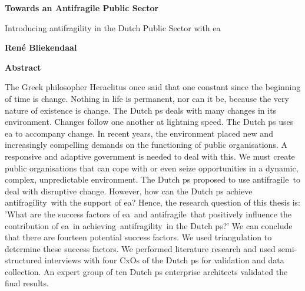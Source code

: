 \thispagestyle{plain}
\begin{center}
	\Large
	\textbf{Towards an Antifragile Public Sector}
	
	\vspace{0.4cm}
	\large
	Introducing \Gls{antifragility} in the Dutch Public Sector with \gls{ea}
	
	\vspace{0.4cm}
	\textbf{René Bliekendaal}
	
	\vspace{0.9cm}
	\textbf{Abstract}
\end{center}

\small \noindent The Greek philosopher Heraclitus once said that one constant since the beginning of time is change. Nothing in life is permanent, nor can it be, because the very nature of existence is change. The Dutch \gls{ps} deals with many changes in its environment. Changes follow one another at lightning speed. The Dutch \gls{ps} uses \gls{ea} to accompany change. In recent years, the environment placed new and increasingly compelling demands on the functioning of public organisations. A responsive and adaptive government is needed to deal with this. We must create public organisations that can cope with or even seize opportunities in a dynamic, complex, unpredictable environment. The Dutch \gls{ps} proposed to use \gls{antifragile} to deal with disruptive change. However, how can the Dutch \gls{ps} achieve \gls{antifragility} with the support of \gls{ea}? Hence, the research question of this thesis is: 'What are the success factors of \gls{ea} and \gls{antifragile} that positively influence the contribution of \gls{ea} in achieving \gls{antifragility} in the Dutch \gls{ps}?' We can conclude that there are fourteen potential success factors. We used triangulation to determine these success factors. We performed literature research and used semi-structured interviews with four CxOs of the Dutch \gls{ps} for validation and data collection. An expert group of ten Dutch \gls{ps} enterprise architects validated the final results.